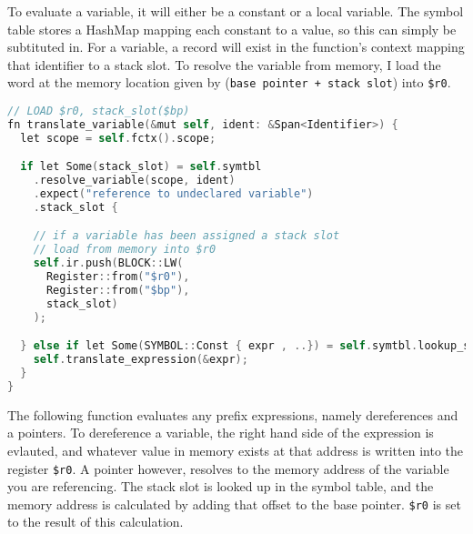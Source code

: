 To evaluate a variable, it will either be a constant or a local variable. The symbol table stores a HashMap mapping each constant to a value, so this can simply be subtituted in. For a variable, a record will exist in the function's context mapping that identifier to a stack slot. To resolve the variable from memory, I load the word at the memory location given by (\texttt{base pointer + stack slot}) into \texttt{\$r0}.

\begin{lstlisting}[language=C]
// LOAD $r0, stack_slot($bp) 
fn translate_variable(&mut self, ident: &Span<Identifier>) {
  let scope = self.fctx().scope;

  if let Some(stack_slot) = self.symtbl
    .resolve_variable(scope, ident)
    .expect("reference to undeclared variable")
    .stack_slot {

    // if a variable has been assigned a stack slot 
    // load from memory into $r0
    self.ir.push(BLOCK::LW(
      Register::from("$r0"), 
      Register::from("$bp"), 
      stack_slot)
    );

  } else if let Some(SYMBOL::Const { expr , ..}) = self.symtbl.lookup_symbol(ident){
    self.translate_expression(&expr);
  }
}
\end{lstlisting}

The following function evaluates any prefix expressions, namely dereferences and a pointers. To dereference a variable, the right hand side of the expression is evlauted, and whatever value in memory exists at that address is written into the register \texttt{\$r0}. A pointer however, resolves to the memory address of the variable you are referencing. The stack slot is looked up in the symbol table, and the memory address is calculated by adding that offset to the base pointer. \texttt{\$r0} is set to the result of this calculation. 


